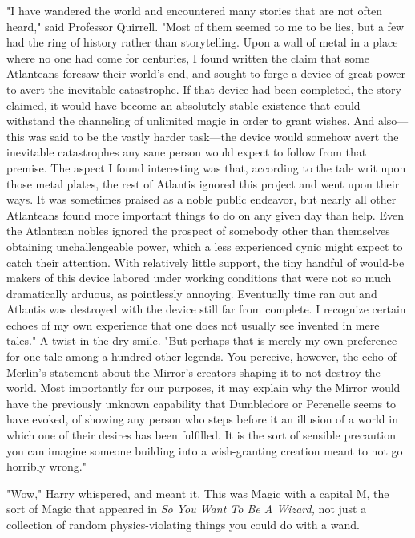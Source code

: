 "I have wandered the world and encountered many stories that are not often
heard," said Professor Quirrell. "Most of them seemed to me to be lies, but a
few had the ring of history rather than storytelling. Upon a wall of metal in a
place where no one had come for centuries, I found written the claim that some
Atlanteans foresaw their world's end, and sought to forge a device of great
power to avert the inevitable catastrophe. If that device had been completed,
the story claimed, it would have become an absolutely stable existence that
could withstand the channeling of unlimited magic in order to grant wishes. And
also—this was said to be the vastly harder task—the device would somehow
avert the inevitable catastrophes any sane person would expect to follow from
that premise. The aspect I found interesting was that, according to the tale
writ upon those metal plates, the rest of Atlantis ignored this project and
went upon their ways. It was sometimes praised as a noble public endeavor, but
nearly all other Atlanteans found more important things to do on any given day
than help. Even the Atlantean nobles ignored the prospect of somebody other
than themselves obtaining unchallengeable power, which a less experienced cynic
might expect to catch their attention. With relatively little support, the tiny
handful of would-be makers of this device labored under working conditions that
were not so much dramatically arduous, as pointlessly annoying. Eventually time
ran out and Atlantis was destroyed with the device still far from complete. I
recognize certain echoes of my own experience that one does not usually see
invented in mere tales." A twist in the dry smile. "But perhaps that is merely
my own preference for one tale among a hundred other legends. You perceive,
however, the echo of Merlin's statement about the Mirror's creators shaping it
to not destroy the world. Most importantly for our purposes, it may explain why
the Mirror would have the previously unknown capability that Dumbledore or
Perenelle seems to have evoked, of showing any person who steps before it an
illusion of a world in which one of their desires has been fulfilled. It is the
sort of sensible precaution you can imagine someone building into a
wish-granting creation meant to not go horribly wrong."

"Wow," Harry whispered, and meant it. This was Magic with a capital M, the sort
of Magic that appeared in \emph{So You Want To Be A Wizard,} not just a
collection of random physics-violating things you could do with a wand.

